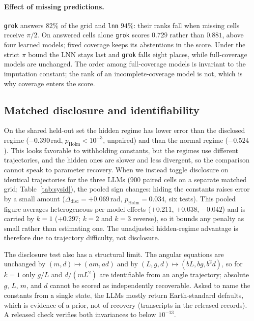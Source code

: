 \documentclass{article}
\begin{document}
\paragraph{Effect of missing predictions.} \texttt{grok} answers $82\%$ of the grid and
\texttt{lnn} $94\%$: their ranks fall when missing cells receive $\pi/2$. On answered cells
alone \texttt{grok} scores $0.729$ rather than $0.881$, above four learned models; fixed
coverage keeps its abstentions in the score. Under the strict $\pi$ bound the LNN stays last
and \texttt{grok} falls eight places, while full-coverage models are unchanged. The order among
full-coverage models is invariant to the imputation constant; the rank of an incomplete-coverage
model is not, which is why coverage enters the score.

\subsection{Matched disclosure and identifiability}
\label{sec:sysid}
On the shared held-out set the hidden regime has lower error than the disclosed regime
($-0.390$\,rad, $p_{\mathrm{Holm}}{<}10^{-3}$, unpaired) and than the normal regime
($-0.524$). This looks favorable to withholding constants, but the regimes use different
trajectories, and the hidden ones are slower and less divergent, so the comparison cannot
speak to parameter recovery. When we instead toggle disclosure on identical trajectories for
the three LLMs ($900$ paired cells on a separate matched grid; Table~\ref{tab:sysid}), the
pooled sign changes: hiding the constants raises error by a small amount
($\Delta_{\mathrm{disc}}{=}{+}0.069$\,rad, $p_{\mathrm{Holm}}{=}0.034$, six tests). This pooled
figure averages heterogeneous per-model effects ($+0.211$, $+0.038$, $-0.042$) and is carried by
$k{=}1$ ($+0.297$; $k{=}2$ and $k{=}3$ reverse), so it bounds any penalty as small rather than
estimating one. The unadjusted hidden-regime advantage is therefore due to trajectory
difficulty, not disclosure.

The disclosure test also has a structural limit. The angular equations are unchanged by
$(m,d)\mapsto(am,ad)$ and by $(L,g,d)\mapsto(bL,bg,b^2d)$, so for $k{=}1$ only $g/L$ and
$d/(mL^2)$ are identifiable from an angle trajectory; absolute $g$, $L$, $m$, and $d$ cannot
be scored as independently recoverable. Asked to name the constants from a single state, the
LLMs mostly return Earth-standard defaults, which is evidence of a prior, not of recovery
(transcripts in the released records). A released check verifies both invariances to below
$10^{-13}$.
\end{document}

